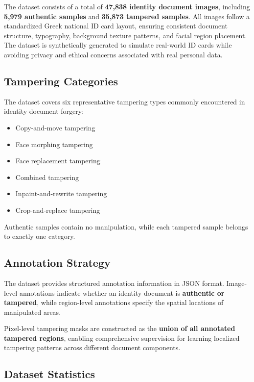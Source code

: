\documentclass[12pt]{article}
\begin{document}
The dataset consists of a total of \textbf{47,838 identity document images}, including \textbf{5,979 authentic samples} and \textbf{35,873 tampered samples}. All images follow a standardized Greek national ID card layout, ensuring consistent document structure, typography, background texture patterns, and facial region placement. The dataset is synthetically generated to simulate real-world ID cards while avoiding privacy and ethical concerns associated with real personal data.

\subsection{Tampering Categories}

The dataset covers six representative tampering types commonly encountered in identity document forgery:

\begin{itemize}
    \item Copy-and-move tampering
    \item Face morphing tampering
    \item Face replacement tampering
    \item Combined tampering
    \item Inpaint-and-rewrite tampering
    \item Crop-and-replace tampering
\end{itemize}

Authentic samples contain no manipulation, while each tampered sample belongs to exactly one category.

\subsection{Annotation Strategy}

The dataset provides structured annotation information in JSON format. Image-level annotations indicate whether an identity document is \textbf{authentic or tampered}, while region-level annotations specify the spatial locations of manipulated areas.

Pixel-level tampering masks are constructed as the \textbf{union of all annotated tampered regions}, enabling comprehensive supervision for learning localized tampering patterns across different document components.

\subsection{Dataset Statistics}
\end{document}
